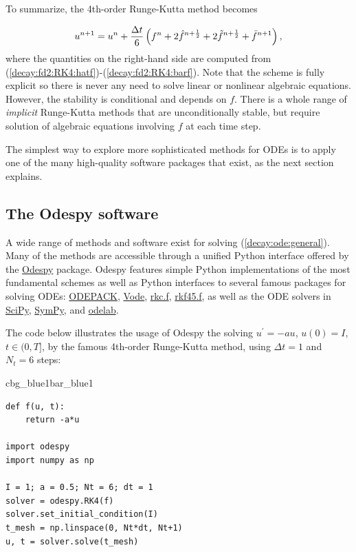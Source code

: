 \documentclass[%
oneside,                 %
final,                   %
10pt]{article}
\newenvironment{_pro_tight}[2]{
   \def\FrameCommand{\color{#2}\vrule width 1mm\normalcolor\colorbox{#1}}
   \FrameRule0.6pt\MakeFramed {\advance\hsize-2mm\FrameRestore}\vskip3mm}
   {\vskip0mm\endMakeFramed}
\newenvironment{pro}[2]{
\bgroup\rmfamily
\fboxsep=0mm\relax
\begin{_pro_tight}{#1}{#2}
\list{}{\parsep=-2mm\parskip=0mm\topsep=0pt\leftmargin=2mm
\rightmargin=2\leftmargin\leftmargin=4pt\relax}
\item\relax}
{\endlist\end{_pro_tight}\egroup}
\begin{document}
To summarize, the 4th-order Runge-Kutta method becomes

\begin{equation}
u^{n+1} = u^n +
\frac{\Delta t}{6}\left( f^n + 2\hat{f}^{n+\frac{1}{2}}
+ 2\tilde{f}^{n+\frac{1}{2}} + \bar{f}^{n+1}\right),
\end{equation}
where the quantities on the right-hand side are computed from
(\ref{decay:fd2:RK4:hatf})-(\ref{decay:fd2:RK4:barf}). Note that
the scheme is fully explicit so there is never any need to solve linear or
nonlinear algebraic
equations. However, the stability is conditional and depends on $f$.
There is a whole range of \emph{implicit} Runge-Kutta methods that
are unconditionally stable, but require solution of algebraic
equations involving $f$ at each time step.

The simplest way to explore more sophisticated methods for ODEs is to
apply one of the many high-quality software packages that exist, as the
next section explains.

\subsection{The Odespy software}

A wide range of methods and software exist for solving (\ref{decay:ode:general}).
Many of the methods are accessible through a unified Python interface offered
by the \href{{https://github.com/hplgit/odespy}}{Odespy} \cite{odespy} package.
Odespy features simple Python implementations of the most fundamental
schemes as well as Python interfaces to several famous packages for
solving ODEs: \href{{https://computation.llnl.gov/casc/odepack/odepack_home.html}}{ODEPACK}, \href{{https://computation.llnl.gov/casc/odepack/odepack_home.html}}{Vode},
\href{{http://www.netlib.org/ode/rkc.f}}{rkc.f}, \href{{http://www.netlib.org/ode/rkf45.f}}{rkf45.f}, as well
as the ODE solvers in \href{{http://docs.scipy.org/doc/scipy/reference/generated/scipy.integrate.ode.html}}{SciPy}, \href{{http://docs.sympy.org/dev/modules/mpmath/calculus/odes.html}}{SymPy}, and \href{{http://olivierverdier.github.com/odelab/}}{odelab}.

The code below illustrates the usage of Odespy the solving $u^{\prime}=-au$,
$u(0)=I$, $t\in (0,T]$,
by the famous 4th-order Runge-Kutta method, using $\Delta t=1$
and $N_t=6$ steps:

\begin{pro}{cbg_blue1}{bar_blue1}\begin{Verbatim}[numbers=none,fontsize=\fontsize{9pt}{9pt},baselinestretch=0.95,xleftmargin=2mm]
def f(u, t):
    return -a*u

import odespy
import numpy as np

I = 1; a = 0.5; Nt = 6; dt = 1
solver = odespy.RK4(f)
solver.set_initial_condition(I)
t_mesh = np.linspace(0, Nt*dt, Nt+1)
u, t = solver.solve(t_mesh)
\end{Verbatim}
\end{pro}
\noindent
\end{document}
